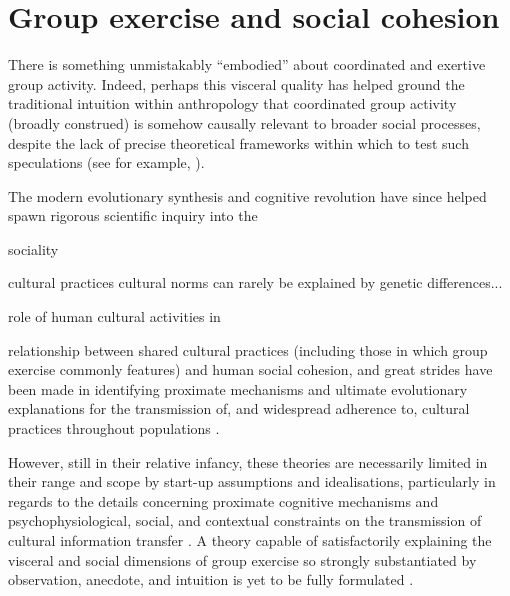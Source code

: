\section{Group exercise and social cohesion}
There is something unmistakably ``embodied'' about coordinated and exertive group activity.
Indeed, perhaps this visceral quality has helped ground the traditional intuition within anthropology that coordinated group activity (broadly construed) is somehow causally relevant to broader social processes, despite the lack of precise theoretical frameworks within which to test such speculations (see for example, \citep{Durkheim1965,Mauss1935,Radcliffe-Brown1952,Turner1974,Merleau-Ponty1956,Bourdieu1990}).

The modern evolutionary synthesis and cognitive revolution have since helped spawn rigorous scientific inquiry into the

sociality

cultural practices
cultural norms can rarely be explained by genetic differences...

 role of human cultural activities in

 relationship between shared cultural practices (including those in which group exercise commonly features) and human social cohesion, and great strides have been made in identifying proximate mechanisms and ultimate evolutionary explanations for the transmission of, and widespread adherence to, cultural practices throughout populations \citep{Dawkins1976,Boyd1988,Sperber1996,Barrett2002,Whitehouse2004,Whitehouse2014,Henrich2007}.

 However, still in their relative infancy, these theories are necessarily limited in their range and scope by start-up assumptions and idealisations, particularly in regards to the details concerning proximate cognitive mechanisms and psychophysiological, social, and contextual constraints on the transmission of cultural information transfer \citep{Sperber1996,Dunbar2012,Claidiere2014}. A theory capable of satisfactorily explaining the visceral and social dimensions of group exercise so strongly substantiated by observation, anecdote, and intuition is yet to be fully formulated \citep{Cohen2017}.


